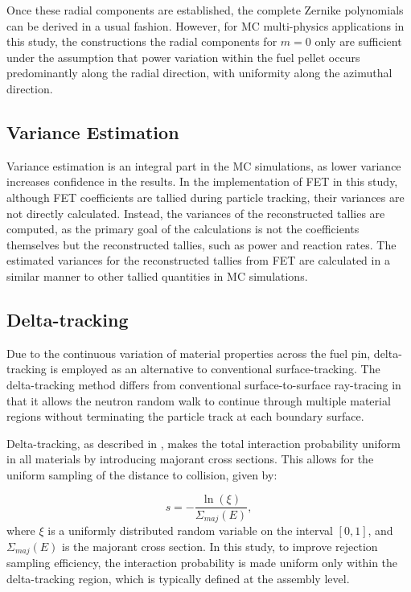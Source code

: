 Once these radial components are established, the complete Zernike polynomials can be derived in a usual fashion. However, for MC multi-physics applications in this study, the constructions the radial components for $m=0$ only are sufficient under the assumption that power variation within the fuel pellet occurs predominantly along the radial direction, with uniformity along the azimuthal direction.

\subsection{Variance Estimation}\label{sec22a}

Variance estimation is an integral part in the MC simulations, as lower variance increases confidence in the results. In the implementation of FET in this study, although FET coefficients are tallied during particle tracking, their variances are not directly calculated. Instead, the variances of the reconstructed tallies are computed, as the primary goal of the calculations is not the coefficients themselves but the reconstructed tallies, such as power and reaction rates. The estimated variances for the reconstructed tallies from FET are calculated in a similar manner to other tallied quantities in MC simulations.

\subsection{Delta-tracking} \label{sec23}

Due to the continuous variation of material properties across the fuel pin, delta-tracking is employed as an alternative to conventional surface-tracking. The delta-tracking method differs from conventional surface-to-surface ray-tracing in that it allows the neutron random walk to continue through multiple material regions without terminating the particle track at each boundary surface.

Delta-tracking, as described in \cite{leppanen_2017, woodcock}, makes the total interaction probability uniform in all materials by introducing majorant cross sections. This allows for the uniform sampling of the distance to collision, given by:

\begin{equation}
    s = -\frac{\ln{\left(\xi\right)}}{\Sigma_{maj}(E)},
    \label{eq8}
\end{equation}
where \(\xi\) is a uniformly distributed random variable on the interval \([0,1]\), and \(\Sigma_{maj}(E)\) is the majorant cross section. In this study, to improve rejection sampling efficiency, the interaction probability is made uniform only within the delta-tracking region, which is typically defined at the assembly level. 

